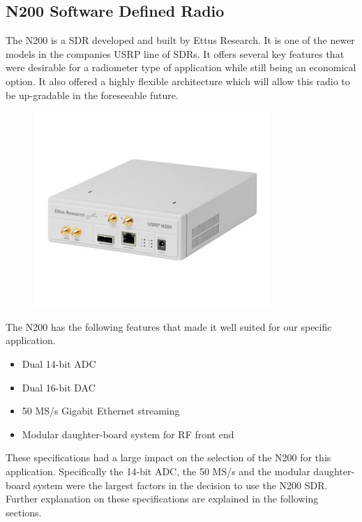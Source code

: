 \subsection{N200 Software Defined Radio}

The N200 is a SDR developed and built by Ettus Research.  It is one of the newer models in the companies USRP line of SDRs.  It offers several key features that were desirable for a radiometer type of application while still being an economical option.  It also offered a highly flexible architecture which will allow this radio to be up-gradable in the foreseeable future.  

{\begin{figure}[h!tb] 
\centering
\includegraphics{Images/n200}
\label{N200}
\end{figure}
}

The N200 has the following features that made it well suited for our specific application.

\begin{itemize}
\item Dual 14-bit ADC
\item Dual 16-bit DAC
\item 50 MS/s Gigabit Ethernet streaming
\item Modular daughter-board system for RF front end
\end{itemize}

These specifications had a large impact on the selection of the N200 for this application.  Specifically the 14-bit ADC, the 50 MS/s and the modular daughter-board system were the largest factors in the decision to use the N200 SDR.  Further explanation on these specifications are explained in the following sections.

